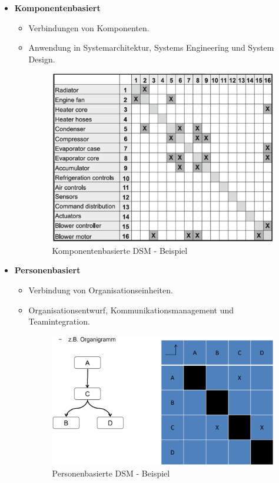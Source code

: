 \begin{itemize}
    \item \textbf{Komponentenbasiert}
        \begin{itemize}
            \item Verbindungen von Komponenten.
            \item Anwendung in Systemarchitektur, Systems Engineering und System Design.
            \begin{figure}[H]
                \centering
                \includegraphics[width=0.6\linewidth]{Bilder/Teil3_KomponentenbasierteDSM.png}
                \caption{Komponentenbasierte DSM - Beispiel}
            \end{figure}
        \end{itemize}
    \item \textbf{Personenbasiert}
        \begin{itemize}
            \item Verbindung von Organisationseinheiten.
            \item Organisationsentwurf, Kommunikationsmanagement und Teamintegration.
            \begin{figure}[H]
                \centering
                \includegraphics[width=0.6\linewidth]{Bilder/Teil3_PersonenbasierteDSM.png}
                \caption{Personenbasierte DSM - Beispiel}
            \end{figure}
        \end{itemize}

\end{itemize}
